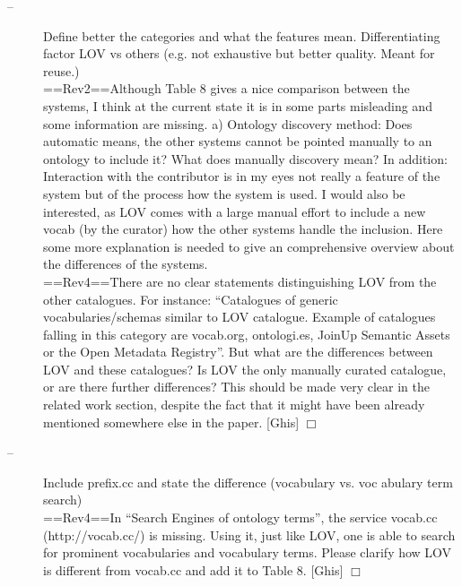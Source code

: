 \documentclass[a4paper,notitlepage]{article}
\newcommand\todo[2]{\item[--] #1 \hfill[#2] $\Box$}%
\begin{document}
\begin{description}
 \todo{Define better the categories and what the features mean. Differentiating factor LOV vs others (e.g. not exhaustive but better quality. Meant for reuse.) \\
==Rev2==Although Table 8 gives a nice comparison between the systems, I think at the current state it is in some parts misleading and some information are missing. a) Ontology discovery method: Does automatic means, the other systems cannot be pointed manually to an ontology to include it? What does manually discovery mean? In addition: Interaction with the contributor is in my eyes not really a feature of the system but of the process how the system is used. I would also be interested, as LOV comes with a large manual effort to include a new vocab (by the curator) how the other systems handle the inclusion. Here some more explanation is needed to give an comprehensive overview about the differences of the systems.\\
==Rev4==There are no clear statements distinguishing LOV from the other catalogues. For instance: “Catalogues of generic vocabularies/schemas similar to LOV catalogue. Example of catalogues falling in this category are vocab.org, ontologi.es, JoinUp Semantic Assets or the Open Metadata Registry”. But what are the differences between LOV and these catalogues? Is LOV the only manually curated catalogue, or are there further differences? This should be made very clear in the related work section, despite the fact that it might have been already mentioned somewhere else in the paper.}{Ghis}

 \todo{Include prefix.cc and state the difference (vocabulary vs. voc abulary term search) \\
==Rev4==In “Search Engines of ontology terms”, the service vocab.cc (http://vocab.cc/) is missing. Using it, just like LOV, one is able to search for prominent vocabularies and vocabulary terms. Please clarify how LOV is different from vocab.cc and add it to Table 8.}{Ghis}


\end{description}
\end{document}
